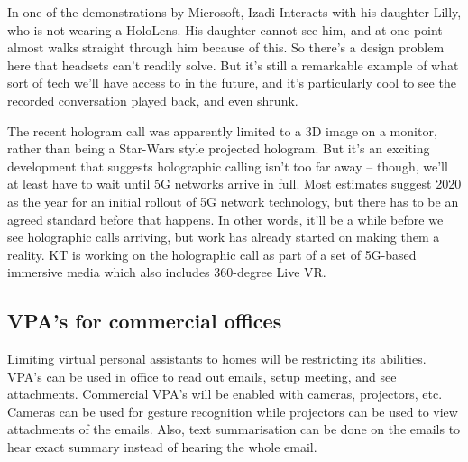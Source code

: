 \documentclass[12pt,a4paper]{article}
\begin{document}
In one of the demonstrations by Microsoft, Izadi Interacts with his daughter Lilly, who is not wearing a HoloLens. His daughter cannot see him, and at one point almost walks straight through him because of this.
So there’s a design problem here that headsets can’t readily solve. But it’s still a remarkable example of what sort of tech we’ll have access to in the future, and it’s particularly cool to see the recorded conversation played back, and even shrunk.

 The recent hologram call was apparently limited to a 3D image on a monitor, rather than being a Star-Wars style projected hologram. But it’s an exciting development that suggests holographic calling isn’t too far away – though, we’ll at least have to wait until 5G networks arrive in full. Most estimates suggest 2020 as the year for an initial rollout of 5G network technology, but there has to be an agreed standard before that happens. In other words, it’ll be a while before we see holographic calls arriving, but work has already started on making them a reality. KT is working on the holographic call as part of a set of 5G-based immersive media which also includes 360-degree Live VR.



\newpage
\begin{center}
\section{VPA’s for commercial offices}
\end{center}
\par
Limiting virtual personal assistants to homes will be restricting its abilities. VPA’s can be used in office to read out emails, setup meeting, and see attachments. Commercial VPA’s will be enabled with cameras, projectors, etc. Cameras can be used for gesture recognition while projectors can be used to view attachments of the emails. Also, text summarisation can be done on the emails to hear exact summary instead of hearing the whole email. 
\end{document}
